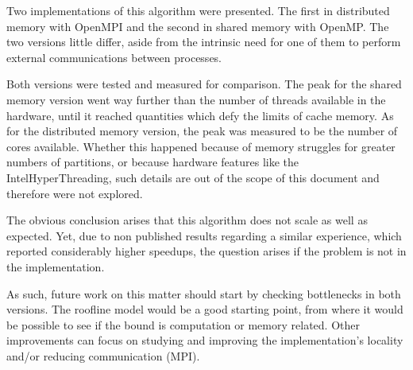 \documentclass[abstract=on,9pt,twocolumn]{scrartcl}
\begin{document}
Two implementations of this algorithm were presented. The first in distributed memory with OpenMPI and the second in shared memory with OpenMP. The two versions little differ, aside from the intrinsic need for one of them to perform external communications between processes.

Both versions were tested and measured for comparison. The peak for the shared memory version went way further than the number of threads available in the hardware, until it reached quantities which defy the limits of cache memory. As for the distributed memory version, the peak was measured to be the number of cores available. Whether this happened because of memory struggles for greater numbers of partitions, or because hardware features like the Intel\textregistered HyperThreading, such details are out of the scope of this document and therefore were not explored.

The obvious conclusion arises that this algorithm does not scale as well as expected. Yet, due to non published results regarding a similar experience, which reported considerably higher speedups, the question arises if the problem is not in the implementation.

As such, future work on this matter should start by checking bottlenecks in both versions. The roofline model would be a good starting point, from where it would be possible to see if the bound is computation or memory related. Other improvements can focus on studying and improving the implementation's locality and/or reducing communication (MPI).






\end{document}
